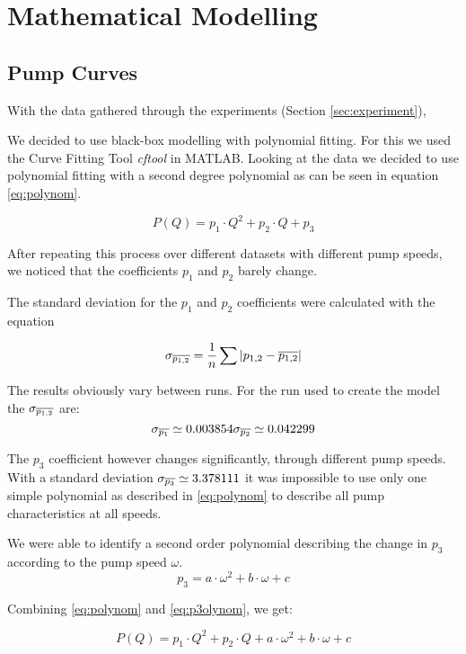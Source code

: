\chapter{Mathematical Modelling}\label{ch:mathmodel}

\section{Pump Curves}\label{sec:pumpcurves}
With the data gathered through the experiments (Section \ref{sec:experiment}),

We decided to use black-box modelling with polynomial fitting.
For this we used the Curve Fitting Tool \cite{cftool}  \textit{cftool}  in MATLAB.
Looking at the data we decided to use polynomial fitting with a second degree polynomial
as can be seen in equation \ref{eq:polynom}.

\begin{equation}
	 P(Q) = p_1 \cdot Q^2 + p_2 \cdot Q + p_3
	 \label{eq:polynom}
\end{equation}

After repeating this process over different datasets with different pump speeds,
we noticed that the coefficients $p_1$ and $p_2$ barely change.

The standard deviation for the $p_1$ and $p_2$ coefficients were calculated with the equation 

\begin{equation}
	\sigma_{\overline{p_{1,2}}} = \dfrac{1}{n}\sum |p_{1,2}-\overline{p_{1,2}}|
	\label{eq:avedev}
\end{equation}

The results obviously vary between runs. For the run used to create the model the $\sigma_{\overline{p_{1,2}}}$ are:
\begin{equation}
	\sigma_{\mean{p_1}} \simeq 0.003854$$
	
	$$\sigma_{\mean{p_2}} \simeq 0.042299
\end{equation}

The $p_3$ coefficient however changes significantly, through different pump speeds.
With a standard deviation $\sigma_{\overline{p_3}} \simeq 3.378111$ it was impossible to use only one simple polynomial as described in \ref{eq:polynom} to describe all pump characteristics at all speeds.

We were able to identify a second order polynomial describing the change in $p_3$ according to the pump speed $\omega$.
\begin{equation}
	 p_3 = a \cdot \omega^2 + b \cdot \omega + c
	 \label{eq:p3olynom}
\end{equation}

Combining \ref{eq:polynom} and \ref{eq:p3olynom}, we get:

\begin{equation}
	P(Q) = p_1 \cdot Q^2 + p_2 \cdot Q + a \cdot \omega^2 + b \cdot \omega + c 
\end{equation}